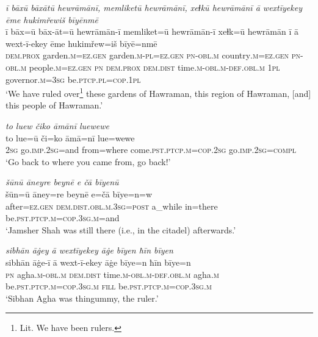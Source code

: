 \ea \label{DP.21}
\textit{ī bāxū bāxātū hewrāmānī, memliketū hewrāmānī, xeɫkū hewrāmānī ā wextīyekey ēme hukimřewiš bīyēnmē} \\ 
\gll ī bāx=ū bāx-āt=ū hewrāmān-ī memliket=ū hewrāmān-ī xeɫk=ū hewrāmān ī ā wext-ī-ekey ēme hukimřew=iš bīyē=nmē \\ 
 \textsc{dem.prox} garden\textsc{.m}\textsc{=ez}\textsc{.gen} garden\textsc{.m}\textsc{-pl}\textsc{=ez}\textsc{.gen} \textsc{pn}\textsc{-obl}\textsc{.m} country\textsc{.m}\textsc{=ez}\textsc{.gen} \textsc{pn}\textsc{-obl}\textsc{.m} people\textsc{.m}\textsc{=ez}\textsc{.gen} \textsc{pn} \textsc{dem.prox} \textsc{dem.dist} time\textsc{.m}\textsc{-obl}\textsc{.m}\textsc{-def}\textsc{.obl}\textsc{.m} \textsc{1pl} governor\textsc{.m}\textsc{=3sg} be\textsc{.ptcp}\textsc{.pl}\textsc{=cop}\textsc{.1pl} \\ 
\glt `We have ruled over\footnote{Lit. We have been rulers.} these gardens of Hawraman, this region of Hawraman, [and] this people of Hawraman.'
\z 
 
\ea \label{DP.24}
\textit{to luew čiko āmānī luewewe} \\ 
\gll to lue=ū či=ko āmā=nī lue=wewe \\ 
 \textsc{2sg} go\textsc{.imp}\textsc{.\textsc{2sg}}=and from=where come\textsc{.pst}\textsc{.ptcp}\textsc{.m}\textsc{=cop}\textsc{.\textsc{2sg}} go\textsc{.imp}\textsc{.\textsc{2sg}}\textsc{=compl} \\ 
\glt `Go back to where you came from, go back!'
\z 
 
\ea \label{DP.25}
\textit{šūnū āneyre beynē e čā bīyenū} \\ 
\gll šūn=ū āney=re beynē e=čā bīye=n=w \\ 
 after\textsc{=ez}\textsc{.gen} \textsc{dem.dist}\textsc{.obl}\textsc{.m}\textsc{.3sg}\textsc{=\textsc{post}} a\_while in=there be\textsc{.pst}\textsc{.ptcp}\textsc{.m}\textsc{=cop}\textsc{.3sg}\textsc{.m}=and \\ 
\glt `Jamsher Shah was still there (i.e., in the citadel) afterwards.'
\z 
 
\ea \label{DP.26}
\textit{sibhān āġey ā wextīyekey āġe bīyen ħīn bīyen} \\ 
\gll sibhān āġe-ī ā wext-ī-ekey āġe bīye=n ħīn bīye=n \\ 
 \textsc{pn} agha\textsc{.m}\textsc{-obl}\textsc{.m} \textsc{dem.dist} time\textsc{.m}\textsc{-obl}\textsc{.m}\textsc{-def}\textsc{.obl}\textsc{.m} agha\textsc{.m} be\textsc{.pst}\textsc{.ptcp}\textsc{.m}\textsc{=cop}\textsc{.3sg}\textsc{.m} \textsc{fill} be\textsc{.pst}\textsc{.ptcp}\textsc{.m}\textsc{=cop}\textsc{.3sg}\textsc{.m} \\ 
\glt `Sibhan Agha was thingummy, the ruler.'
\z 
 
